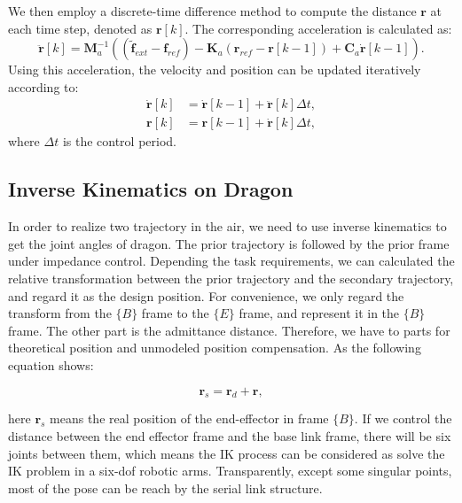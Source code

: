 We then employ a discrete-time difference method to compute the distance $\boldsymbol{r}$ at each time step, denoted as $\boldsymbol{r}[k]$. The corresponding acceleration is calculated as: 
\begin{equation}
\label{eq:difference method1}
\boldsymbol{\ddot{r}}[k]=\boldsymbol{M}^{-1}_a(({\boldsymbol{\tilde{f}}_{ext}}-\boldsymbol{f}_{ref})-\boldsymbol{K}_a(\boldsymbol{r}_{ref}-\boldsymbol{r}[k-1])+\boldsymbol{C}_a\boldsymbol{\dot{r}}[k-1]).
\end{equation}
Using this acceleration, the velocity and position can be updated iteratively according to:
\begin{subequations}
\label{eq:difference method2}
\begin{align}
\boldsymbol{\dot{r}}[k]&=\boldsymbol{\dot{r}}[k-1]+\boldsymbol{\ddot{r}}[k]\Delta t, \\[2pt]
\boldsymbol{r}[k]&=\boldsymbol{r}[k-1]+\boldsymbol{\dot{r}}[k]\Delta t,
\end{align}
\end{subequations}
where $\Delta t$ is the control period.



\subsection{Inverse Kinematics on Dragon}
In order to realize two trajectory in the air, we need to use inverse kinematics to get the joint angles of dragon. The prior trajectory is followed by the prior frame under impedance control. Depending the task requirements, we can calculated the relative transformation between the prior trajectory and the secondary trajectory, and regard it as the design position. For convenience, we only regard the transform from the $\{B\}$ frame to the $\{E\}$ frame, and represent it in the $\{B\}$ frame. The other part is the admittance distance. Therefore, we have to parts for theoretical position and unmodeled position compensation. As the following equation shows:


\begin{equation}
\label{eq:IK distance dragon}
\boldsymbol{r}_s = \boldsymbol{r}_{d} + \boldsymbol{r},
\end{equation}

here $\boldsymbol{r}_s$ means the real position of the end-effector in frame $\{B\}$. 
If we control the distance between the end effector frame and the base link frame, there will be six joints between them, which means the IK process can be considered as solve the IK problem in a six-dof robotic arms. Transparently, except some singular points, most of the pose can be reach by the serial link structure.

